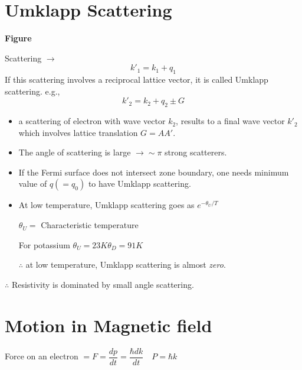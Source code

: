 \section*{Umklapp Scattering}
\begin{center}
{\bf Figure}
\end{center}

Scattering $\to$
$$
k'_{1}=k_{1}+q_{1}
$$
If this scattering involves a reciprocal lattice vector, it is called Umklapp scattering. e.g.,
$$
k'_{2}=k_{2}+q_{2}\pm G
$$
\begin{itemize}
\item a scattering of electron with wave vector $k_{2}$, results to a final wave vector $k'_{2}$ which involves lattice translation $G=AA'$.

\item The angle of scattering is large $\to \sim \pi$ strong scatterers.

\item If the Fermi surface does not intersect zone boundary, one needs minimum value of $q(=q_{0})$ to have Umklapp scattering.

\item At low temperature, Umklapp scattering goes as $e^{-\theta_{U}/T}$

$\theta_{U}=$ Characteristic temperature

For potassium $\theta_{U}=23K$\quad $\theta_{D}=91K$

$\therefore$ at low temperature, Umklapp scattering is almost {\em zero}.
\end{itemize}
$\therefore$ Resistivity is dominated by small angle scattering.

\section*{Motion in Magnetic field}

Force on an electron $=F=\dfrac{dp}{dt}=\dfrac{\hbar dk}{dt}\quad P=\hbar k$

